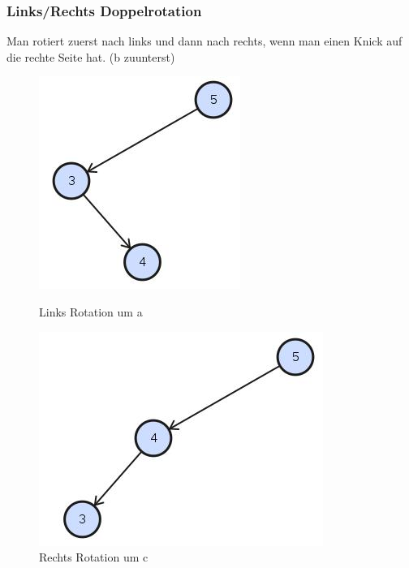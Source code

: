 \subsubsection{Links/Rechts Doppelrotation}
Man rotiert zuerst nach links und dann nach rechts, wenn man einen Knick auf die rechte Seite hat. (b zuunterst)
\begin{figure}[h!]
	\centering
	\begin{minipage}[t]{0.4\textwidth}
		\centering
		\includegraphics[width=0.7\linewidth]{images/avl_leftright_rotation_1.jpg}
		\caption{Links Rotation um a}
		\label{fig:trieexample}
	\end{minipage}
	\begin{minipage}[t]{0.4\textwidth}
		\centering
		\includegraphics[width=0.9\linewidth]{images/avl_right_rotation_1}
		\caption{Rechts Rotation um c}

\end{minipage}
\end{figure}
